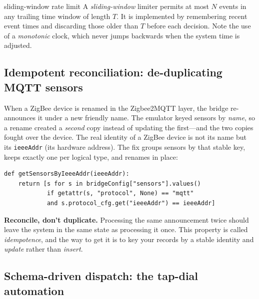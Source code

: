 \documentclass[11pt,a4paper]{article}
\newcommand{\code}[1]{\texttt{#1}}
\begin{document}
\begin{defbox}{sliding-window rate limit}
A \emph{sliding-window} limiter permits at most $N$ events in any trailing time
window of length $T$. It is implemented by remembering recent event times and
discarding those older than $T$ before each decision. Note the use of a
\emph{monotonic} clock, which never jumps backwards when the system time is~\cite{pytime}
adjusted.
\end{defbox}

\subsection{Idempotent reconciliation: de-duplicating MQTT sensors}

When a ZigBee device is renamed in the Zigbee2MQTT layer, the bridge re-announces
it under a new friendly name. The emulator keyed sensors by \emph{name}, so a
rename created a \emph{second} copy instead of updating the first---and the two
copies fought over the device. The real identity of a ZigBee device is not its
name but its \code{ieeeAddr} (its hardware address). The fix groups sensors by
that stable key, keeps exactly one per logical type, and renames in place:

\begin{lstlisting}
def getSensorsByIeeeAddr(ieeeAddr):
    return [s for s in bridgeConfig["sensors"].values()
            if getattr(s, "protocol", None) == "mqtt"
            and s.protocol_cfg.get("ieeeAddr") == ieeeAddr]
\end{lstlisting}

\begin{keyidea}
\textbf{Reconcile, don't duplicate.} Processing the same announcement twice
should leave the system in the same state as processing it once. This property
is called \emph{idempotence}, and the way to get it is to key your records by a
stable identity and \emph{update} rather than \emph{insert}.
\end{keyidea}

\subsection{Schema-driven dispatch: the tap-dial automation}
\end{document}
